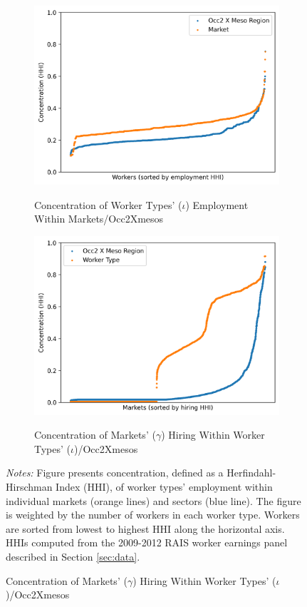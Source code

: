 \documentclass[12pt]{article}
\def\g{\gamma}
\def\i{\iota}
\theoremstyle{definition}
\theoremstyle{plain}
\begin{document}
\begin{figure}
	\centering
	\caption{Employment/Hiring Concentration According to Different Worker and Job Classifications}
	\begin{subfigure}{\textwidth}
		\centering
		\caption{Concentration of Worker Types' ($\i$) Employment Within Markets/Occ2Xmesos}
		\includegraphics[width=0.7\linewidth]{../Results/concentration_figures/concentration_figures__iota__occ2Xmeso__gamma.png}
		\label{fig:concentration_figures__iota__occ2Xmeso__gamma}
	\end{subfigure}
	\begin{subfigure}{\textwidth}
		\centering
		\caption{Concentration of Markets' ($\g$) Hiring Within Worker Types' ($\i$)/Occ2Xmesos}
		\includegraphics[width=0.7\linewidth]{../Results/concentration_figures/concentration_figures__gamma__occ2Xmeso_first__iota}
		\label{fig:concentration_figures__gamma__occ2Xmeso_first__iota}
	\end{subfigure}
	\label{fig:concentration_figures_iota_gamma_hhi}
	\footnotesize\flushleft \emph{Notes:} Figure presents concentration, defined as a Herfindahl-Hirschman Index (HHI), of worker types' employment within individual markets (orange lines) and sectors (blue line). The figure is weighted by the number of workers in each worker type. Workers are sorted from lowest to highest HHI along the horizontal axis. HHIs computed from the 2009-2012 RAIS worker earnings panel described in Section \ref{sec:data}.
\end{figure}
\end{document}
